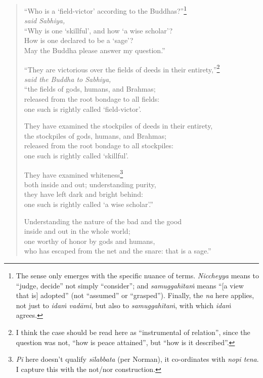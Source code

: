 \documentclass[12pt,openany]{book}%
\newcommand*{\scspeaker}[1]{\hspace{2em}\textit{#1}}
\begin{document}
\begin{verse}%
“Who is a ‘field-victor’ according to the Buddhas?”\footnote{The sense only emerges with the specific nuance of terms. \textit{Niccheyya} means to “judge, decide” not simply “consider”; and \textit{\textsanskrit{samuggahītaṁ}} means “[a view that is] adopted” (not “assumed” or “grasped”). Finally, the \textit{na} here applies, not just to \textit{\textsanskrit{idaṁ} \textsanskrit{vadāmi}}, but also to \textit{\textsanskrit{samuggahītaṁ}}, with which \textit{\textsanskrit{idaṁ}} agrees. } \\
\scspeaker{said Sabhiya, }\\
“Why is one ‘skillful’, and how ‘a wise scholar’? \\
How is one declared to be a ‘sage’? \\
May the Buddha please answer my question.” 

“They are victorious over the fields of deeds in their entirety,”\footnote{I think the case should be read here as “instrumental of relation”, since the question was not, “how is peace attained”, but “how is it described”. } \\
\scspeaker{said the Buddha to Sabhiya, }\\
“the fields of gods, humans, and Brahmas; \\
released from the root bondage to all fields: \\
one such is rightly called ‘field-victor’. 

They have examined the stockpiles of deeds in their entirety, \\
the stockpiles of gods, humans, and Brahmas; \\
released from the root bondage to all stockpiles: \\
one such is rightly called ‘skillful’. 

They have examined whiteness\footnote{\textit{Pi} here doesn’t qualify \textit{\textsanskrit{sīlabbata}} (per Norman), it co-ordinates with \textit{nopi tena}. I capture this with the not/nor construction. } \\
both inside and out; understanding purity, \\
they have left dark and bright behind: \\
one such is rightly called ‘a wise scholar’.” 

Understanding the nature of the bad and the good \\
inside and out in the whole world; \\
one worthy of honor by gods and humans, \\
who has escaped from the net and the snare: that is a sage.” 

%
\end{verse}
\end{document}

